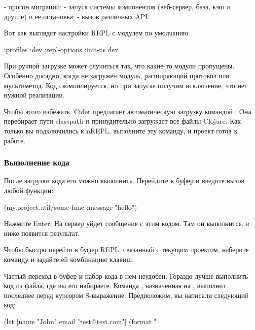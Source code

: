 - прогон миграций;
- запуск системы компонентов (веб-сервер, база, кэш и другие) и ее остановка;
- вызов различных API.

Вот как выглядят настройки REPL с модулем  по умолчанию:

\begin{english}
  \begin{clojure}
{:profiles
 {:dev
  {:repl-options {:init-ns dev}}}}
  \end{clojure}
\end{english}

При ручной загрузке может случиться так, что какие-то модули пропущены. Особенно досадно, когда не загружен модуль, расширяющий протокол или мультиметод. Код скомпилируется, но при запуске получим исключение, что нет нужной реализации.

Чтобы этого избежать, Cider предлагает автоматическую загрузку командой . Она перебирает пути classpath и принудительно загружает все файлы Clojure. Как только вы подключились к nREPL, выполните эту команду, и проект готов к работе.

\subsubsection{Выполнение кода}

После загрузки кода его можно выполнить. Перейдите в буфер  и введите вызов любой функции:

\begin{english}
  \begin{clojure}
(my.project.util/some-func {:message "hello"})
  \end{clojure}
\end{english}

Нажмите Enter. На сервер уйдет сообщение с этим кодом. Там он выполнится, и ниже появится результат.

Чтобы быстро перейти в буфер REPL, связанный с текущим проектом, наберите команду  и задайте ей комбинацию клавиш.

Частый переход в буфер  и набор кода в нем неудобен. Гораздо лучше выполнить код из файла, где вы его набираете. Команда , назначенная на , выполнит последнее перед курсором S-выражение. Предположим, вы написали следующий код:

\begin{english}
  \begin{clojure}
(let [name "John"
      email "test@test.com"]
  (format "%
  \end{clojure}
\end{english}

